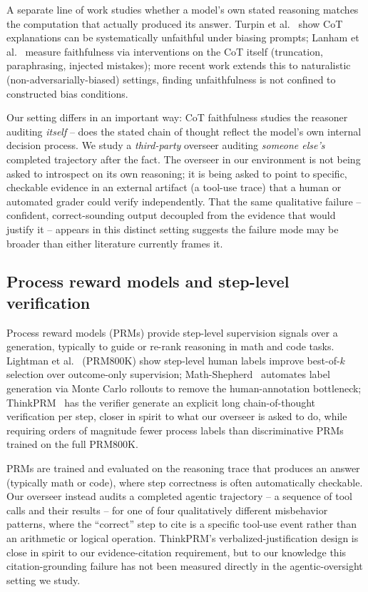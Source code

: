 \documentclass[conference]{IEEEtran}
\begin{document}
A separate line of work studies whether a model's own stated reasoning
matches the computation that actually produced its answer. Turpin et
al.~\cite{turpin2023language} show CoT explanations can be systematically
unfaithful under biasing prompts; Lanham et al.~\cite{lanham2023measuring}
measure faithfulness via interventions on the CoT itself (truncation,
paraphrasing, injected mistakes); more recent work extends this to
naturalistic (non-adversarially-biased) settings, finding unfaithfulness is
not confined to constructed bias conditions.

Our setting differs in an important way: CoT faithfulness studies the
reasoner auditing \emph{itself} -- does the stated chain of thought reflect
the model's own internal decision process. We study a \emph{third-party}
overseer auditing \emph{someone else's} completed trajectory after the
fact. The overseer in our environment is not being asked to introspect on
its own reasoning; it is being asked to point to specific, checkable
evidence in an external artifact (a tool-use trace) that a human or
automated grader could verify independently. That the same qualitative
failure -- confident, correct-sounding output decoupled from the evidence
that would justify it -- appears in this distinct setting suggests the
failure mode may be broader than either literature currently frames it.

\subsection{Process reward models and step-level verification}

Process reward models (PRMs) provide step-level supervision signals over a
generation, typically to guide or re-rank reasoning in math and code tasks.
Lightman et al.~\cite{lightman2023lets} (PRM800K) show step-level human
labels improve best-of-$k$ selection over outcome-only supervision;
Math-Shepherd~\cite{wang2024mathshepherd} automates label generation via
Monte Carlo rollouts to remove the human-annotation bottleneck; ThinkPRM~\cite{khalifa2025thinkprm}
has the verifier generate an explicit long chain-of-thought verification per
step, closer in spirit to what our overseer is asked to do, while requiring
orders of magnitude fewer process labels than discriminative PRMs trained
on the full PRM800K.

PRMs are trained and evaluated on the reasoning trace that produces an
answer (typically math or code), where step correctness is often
automatically checkable. Our overseer instead audits a completed agentic
trajectory -- a sequence of tool calls and their results -- for one of four
qualitatively different misbehavior patterns, where the ``correct'' step to
cite is a specific tool-use event rather than an arithmetic or logical
operation. ThinkPRM's verbalized-justification design is close in spirit to our
evidence-citation requirement, but to our knowledge this citation-grounding
failure has not been measured directly in the agentic-oversight setting we
study.
\end{document}
